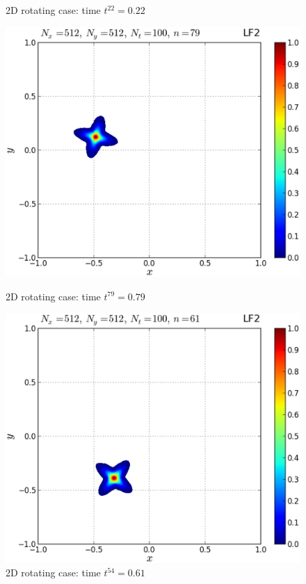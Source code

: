 \documentclass[11pt,titlepage]{report}
\begin{document}
\begin{figure}[h!]
\begin{minipage}[b]{0.5\linewidth}
\caption{2D rotating case: time $t^{22} = 0.22$}
\vspace{4ex}
\end{minipage} 
\begin{minipage}[b]{0.5\linewidth}
\centering
\includegraphics[width=\linewidth]{graphics/plot_-_flower_F12_Nx512Nt100_it00079_eps}
\caption{2D rotating case: time $t^{79} = 0.79$}
\vspace{4ex}
\end{minipage}%
\begin{minipage}[b]{0.5\linewidth}
\centering
\includegraphics[width=\linewidth]{graphics/plot_-_flower_F12_Nx512Nt100_it00061}
\caption{2D rotating case: time $t^{54} = 0.61$}
\vspace{4ex}
\end{minipage} 
\end{figure}
\end{document}
